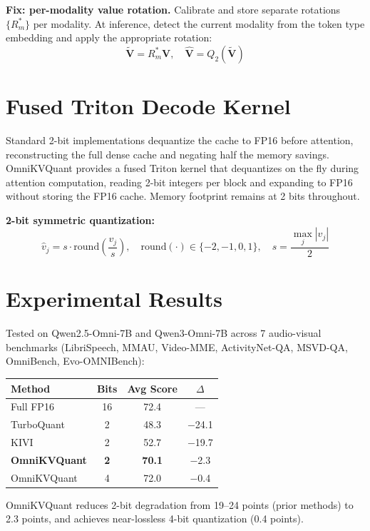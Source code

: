 \documentclass[10pt,twocolumn]{article}
\begin{document}
\textbf{Fix: per-modality value rotation.} Calibrate and store
separate rotations $\{R^*_m\}$ per modality. At inference, detect
the current modality from the token type embedding and apply the
appropriate rotation:
\[
  \tilde{\mathbf{V}} = R^*_m \mathbf{V}, \quad
  \hat{\mathbf{V}} = Q_2(\tilde{\mathbf{V}})
\]

\section{Fused Triton Decode Kernel}

Standard 2-bit implementations dequantize the cache to FP16 before
attention, reconstructing the full dense cache and negating half the
memory savings. OmniKVQuant provides a fused Triton kernel that
dequantizes on the fly during attention computation, reading 2-bit
integers per block and expanding to FP16 without storing the
FP16 cache. Memory footprint remains at 2 bits throughout.

\textbf{2-bit symmetric quantization:}
\[
  \hat{v}_j = s \cdot \mathrm{round}\!\left(\frac{v_j}{s}\right),
  \quad \mathrm{round}(\cdot) \in \{-2,-1,0,1\},
  \quad s = \frac{\max_j |v_j|}{2}
\]

\section{Experimental Results}

Tested on Qwen2.5-Omni-7B and Qwen3-Omni-7B across 7 audio-visual
benchmarks (LibriSpeech, MMAU, Video-MME, ActivityNet-QA,
MSVD-QA, OmniBench, Evo-OMNIBench):

\begin{center}
\begin{tabular}{lccc}
\toprule
Method & Bits & Avg Score & $\Delta$ \\
\midrule
Full FP16           & 16 & 72.4 & --- \\
TurboQuant          & 2  & 48.3 & $-$24.1 \\
KIVI                & 2  & 52.7 & $-$19.7 \\
\textbf{OmniKVQuant} & \textbf{2} & \textbf{70.1} & $-$2.3 \\
OmniKVQuant         & 4  & 72.0 & $-$0.4 \\
\bottomrule
\end{tabular}
\end{center}

OmniKVQuant reduces 2-bit degradation from 19--24 points (prior methods)
to 2.3 points, and achieves near-lossless 4-bit quantization (0.4 points).
\end{document}
